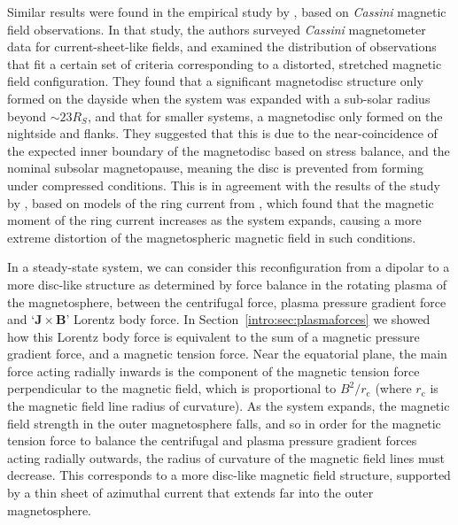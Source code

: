 Similar results were found in the empirical study by \citet{arridge2008}, based on \textit{Cassini} magnetic field observations. In that study, the authors surveyed \textit{Cassini} magnetometer data for current-sheet-like fields, and examined the distribution of observations that fit a certain set of criteria corresponding to a distorted, stretched magnetic field configuration. They found that a significant magnetodisc structure only formed on the dayside when the system was expanded with a sub-solar radius beyond ${\sim}{23}{R_S}$, and that for smaller systems, a magnetodisc only formed on the nightside and flanks. They suggested that this is due to the near-coincidence of the expected inner boundary of the magnetodisc based on stress balance, and the nominal subsolar magnetopause, meaning the disc is prevented from forming under compressed conditions. This is in agreement with the results of the study by \citet{bunce2008}, based on models of the ring current from \citet{bunce2007}, which found that the magnetic moment of the ring current increases as the system expands, causing a more extreme distortion of the magnetospheric magnetic field in such conditions.  

In a steady-state system, we can consider this reconfiguration from a dipolar to a more disc-like structure  as determined by force balance in the rotating plasma of the magnetosphere, between the centrifugal force, plasma pressure gradient force and `$\boldsymbol{J}\times\boldsymbol{B}$' Lorentz body force. In Section~\ref{intro:sec:plasmaforces} we showed how this Lorentz body force is equivalent to the sum of a magnetic pressure gradient force, and a magnetic tension force. Near the equatorial plane, the main force acting radially inwards is the component of the magnetic tension force perpendicular to the magnetic field, which is proportional to $B^2/r_\mathrm{c}$ (where $r_\mathrm{c}$ is the magnetic field line radius of curvature). As the system expands, the magnetic field strength in the outer magnetosphere falls, and so in order for the magnetic tension force to balance the centrifugal and plasma pressure gradient forces acting radially outwards, the radius of curvature of the magnetic field lines must decrease. This corresponds to a more disc-like magnetic field structure, supported by a thin sheet of azimuthal current that extends far into the outer magnetosphere. 

